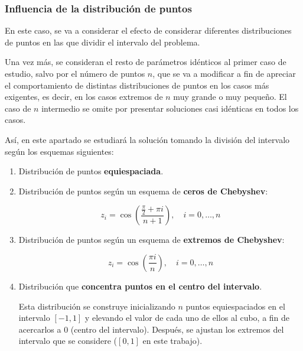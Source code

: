 \subsubsection{Influencia de la distribución de puntos} \label{ap:infl_distrib}

En este caso, se va a considerar el efecto de considerar diferentes distribuciones de puntos en las que dividir el intervalo del problema. 

Una vez más, se consideran el resto de parámetros idénticos al primer caso de estudio, salvo por el número de puntos $n$, que se va a modificar a fin de apreciar el comportamiento de distintas distribuciones de puntos en los casos más exigentes, es decir, en los casos extremos de $n$ muy grande o muy pequeño. El caso de $n$ intermedio se omite por presentar soluciones casi idénticas en todos los casos.

Así, en este apartado se estudiará la solución tomando la división del intervalo según los esquemas siguientes:

\begin{enumerate}
    \item Distribución de puntos \textbf{equiespaciada}.

    \item Distribución de puntos según un esquema de \textbf{ceros de Chebyshev}: 
    
    \begin{equation*}
        z_i = \cos{ \left( \frac{\frac{\pi}{2} + \pi i}{n + 1} \right) }, \quad i = 0, \dots , n
    \end{equation*}

    \item Distribución de puntos según un esquema de \textbf{extremos de Chebyshev}: 

    \begin{equation*}
        z_i =  \cos{ \left( \frac{\pi i}{n} \right) }, \quad i = 0, \dots , n
    \end{equation*}

    \item Distribución que \textbf{concentra puntos en el centro del intervalo}.

    Esta distribución se construye inicializando $n$ puntos equiespaciados en el intervalo $[-1, 1]$ y elevando el valor de cada uno de ellos al cubo, a fin de acercarlos a 0 (centro del intervalo). Después, se ajustan los extremos del intervalo que se considere ($[0, 1]$ en este trabajo). 
\end{enumerate}

